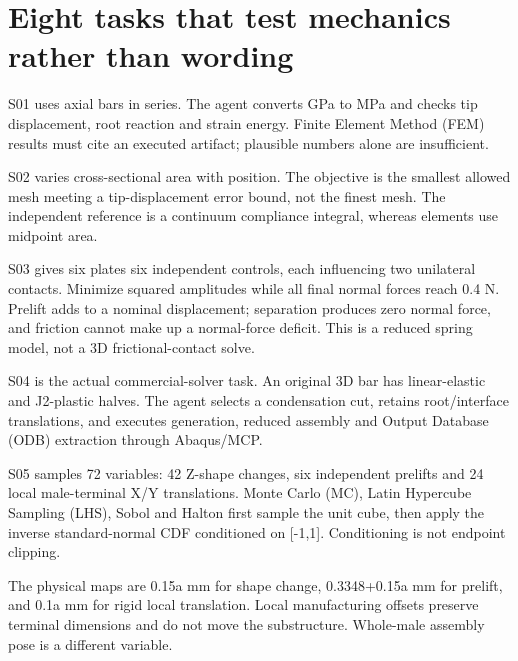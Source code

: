 \documentclass[11pt,a4paper]{ctexart}
\begin{document}
\par

\section{Eight tasks that test mechanics rather than wording}

S01 uses axial bars in series. The agent converts GPa to MPa and checks tip displacement, root reaction and strain energy. Finite Element Method (FEM) results must cite an executed artifact; plausible numbers alone are insufficient.

\par

S02 varies cross-sectional area with position. The objective is the smallest allowed mesh meeting a tip-displacement error bound, not the finest mesh. The independent reference is a continuum compliance integral, whereas elements use midpoint area.

\par

S03 gives six plates six independent controls, each influencing two unilateral contacts. Minimize squared amplitudes while all final normal forces reach 0.4 N. Prelift adds to a nominal displacement; separation produces zero normal force, and friction cannot make up a normal-force deficit. This is a reduced spring model, not a 3D frictional-contact solve.

\par

S04 is the actual commercial-solver task. An original 3D bar has linear-elastic and J2-plastic halves. The agent selects a condensation cut, retains root/interface translations, and executes generation, reduced assembly and Output Database (ODB) extraction through Abaqus/MCP.

\par

S05 samples 72 variables: 42 Z-shape changes, six independent prelifts and 24 local male-terminal X/Y translations. Monte Carlo (MC), Latin Hypercube Sampling (LHS), Sobol and Halton first sample the unit cube, then apply the inverse standard-normal CDF conditioned on [-1,1]. Conditioning is not endpoint clipping.

\par

The physical maps are 0.15a mm for shape change, 0.3348+0.15a mm for prelift, and 0.1a mm for rigid local translation. Local manufacturing offsets preserve terminal dimensions and do not move the substructure. Whole-male assembly pose is a different variable.
\end{document}
